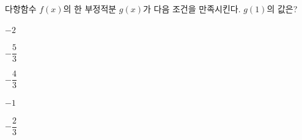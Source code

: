 다항함수 $f(x)$의 한 부정적분 $g(x)$가 다음 조건을 만족시킨다.  \noindent $g(1)$의 값은?
\begin{choices32}{\rule[-3ex]{0pt}{8ex}$-2$}{\rule[-3ex]{0pt}{8ex}$-\dfrac{5}{3}$}{\rule[-3ex]{0pt}{8ex}$-\dfrac{4}{3}$}{\rule[-3ex]{0pt}{8ex}$-1$}{\rule[-3ex]{0pt}{8ex}$-\dfrac{2}{3}$}\end{choices32}
